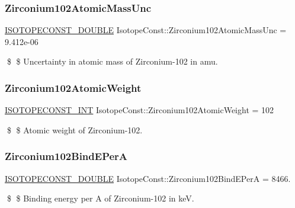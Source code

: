 \subsubsection{\texorpdfstring{Zirconium102\+Atomic\+Mass\+Unc}{Zirconium102AtomicMassUnc}}
{\footnotesize\ttfamily \mbox{\hyperlink{group___isotope_const-_macros_ga8f45a7272ce02c0b4c65c44636ed719a}{I\+S\+O\+T\+O\+P\+E\+C\+O\+N\+S\+T\+\_\+\+D\+O\+U\+B\+LE}} Isotope\+Const\+::\+Zirconium102\+Atomic\+Mass\+Unc = 9.\+412e-\/06}

\$ \$ Uncertainty in atomic mass of Zirconium-\/102 in amu. \mbox{\label{group___isotope_const-_zirconium-_zr102_ga033aa639f92ea57a90415a6c7f9fc1ee}} 
\subsubsection{\texorpdfstring{Zirconium102\+Atomic\+Weight}{Zirconium102AtomicWeight}}
{\footnotesize\ttfamily \mbox{\hyperlink{group___isotope_const-_macros_ga5f18360b3e99483a35c32d789e62621c}{I\+S\+O\+T\+O\+P\+E\+C\+O\+N\+S\+T\+\_\+\+I\+NT}} Isotope\+Const\+::\+Zirconium102\+Atomic\+Weight = 102}

\$ \$ Atomic weight of Zirconium-\/102. \mbox{\label{group___isotope_const-_zirconium-_zr102_ga2018ca170c579f63c4c382485a5ae939}} 
\subsubsection{\texorpdfstring{Zirconium102\+Bind\+E\+PerA}{Zirconium102BindEPerA}}
{\footnotesize\ttfamily \mbox{\hyperlink{group___isotope_const-_macros_ga8f45a7272ce02c0b4c65c44636ed719a}{I\+S\+O\+T\+O\+P\+E\+C\+O\+N\+S\+T\+\_\+\+D\+O\+U\+B\+LE}} Isotope\+Const\+::\+Zirconium102\+Bind\+E\+PerA = 8466.}

\$ \$ Binding energy per A of Zirconium-\/102 in keV. \mbox{\label{group___isotope_const-_zirconium-_zr102_gaeffdb9b4c0a10ebe6998b044232ff07e}} 
